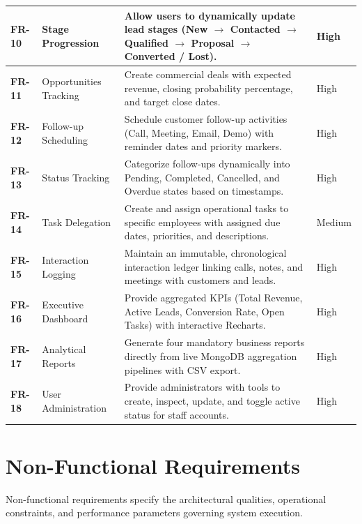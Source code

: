 \begin{table}[h!]
\begin{tabular}{|p{1.8cm}|p{4.2cm}|p{6.8cm}|p{1.7cm}|}
\textbf{FR-10} & Stage Progression & Allow users to dynamically update lead stages (New $\rightarrow$ Contacted $\rightarrow$ Qualified $\rightarrow$ Proposal $\rightarrow$ Converted / Lost). & High \\ \hline
\textbf{FR-11} & Opportunities Tracking & Create commercial deals with expected revenue, closing probability percentage, and target close dates. & High \\ \hline
\textbf{FR-12} & Follow-up Scheduling & Schedule customer follow-up activities (Call, Meeting, Email, Demo) with reminder dates and priority markers. & High \\ \hline
\textbf{FR-13} & Status Tracking & Categorize follow-ups dynamically into Pending, Completed, Cancelled, and Overdue states based on timestamps. & High \\ \hline
\textbf{FR-14} & Task Delegation & Create and assign operational tasks to specific employees with assigned due dates, priorities, and descriptions. & Medium \\ \hline
\textbf{FR-15} & Interaction Logging & Maintain an immutable, chronological interaction ledger linking calls, notes, and meetings with customers and leads. & High \\ \hline
\textbf{FR-16} & Executive Dashboard & Provide aggregated KPIs (Total Revenue, Active Leads, Conversion Rate, Open Tasks) with interactive Recharts. & High \\ \hline
\textbf{FR-17} & Analytical Reports & Generate four mandatory business reports directly from live MongoDB aggregation pipelines with CSV export. & High \\ \hline
\textbf{FR-18} & User Administration & Provide administrators with tools to create, inspect, update, and toggle active status for staff accounts. & High \\ \hline
\end{tabular}
\end{table}

\section{Non-Functional Requirements}
Non-functional requirements specify the architectural qualities, operational constraints, and performance parameters governing system execution.

